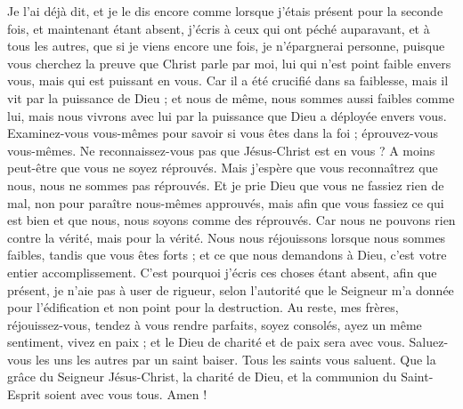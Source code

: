 \begin{multicols}{2}
Je l'ai déjà dit, et je le dis encore comme lorsque j'étais présent pour la seconde fois, et maintenant étant absent, j'écris à ceux qui ont péché auparavant, et à tous les autres, que si je viens encore une fois, je n'épargnerai personne,
puisque vous cherchez la preuve que Christ parle par moi, lui qui n'est point faible envers vous, mais qui est puissant en vous.
Car il a été crucifié dans sa faiblesse, mais il vit par la puissance de Dieu ; et nous de même, nous sommes aussi faibles comme lui, mais nous vivrons avec lui par la puissance que Dieu a déployée envers vous.
Examinez-vous vous-mêmes pour savoir si vous êtes dans la foi ; éprouvez-vous vous-mêmes. Ne reconnaissez-vous pas que Jésus-Christ est en vous ? A moins peut-être que vous ne soyez réprouvés.
Mais j'espère que vous reconnaîtrez que nous, nous ne sommes pas réprouvés.
Et je prie Dieu que vous ne fassiez rien de mal, non pour paraître nous-mêmes approuvés, mais afin que vous fassiez ce qui est bien et que nous, nous soyons comme des réprouvés.
Car nous ne pouvons rien contre la vérité, mais pour la vérité.
Nous nous réjouissons lorsque nous sommes faibles, tandis que vous êtes forts ; et ce que nous demandons à Dieu, c’est votre entier accomplissement.
C'est pourquoi j'écris ces choses étant absent, afin que présent, je n’aie pas à user de rigueur, selon l’autorité que le Seigneur m'a donnée pour l'édification et non point pour la destruction.
Au reste, mes frères, réjouissez-vous, tendez à vous rendre parfaits, soyez consolés, ayez un même sentiment, vivez en paix ; et le Dieu de charité et de paix sera avec vous.
Saluez-vous les uns les autres par un saint baiser. Tous les saints vous saluent.
Que la grâce du Seigneur Jésus-Christ, la charité de Dieu, et la communion du Saint-Esprit soient avec vous tous. Amen !
\PPE{}
\end{multicols}
